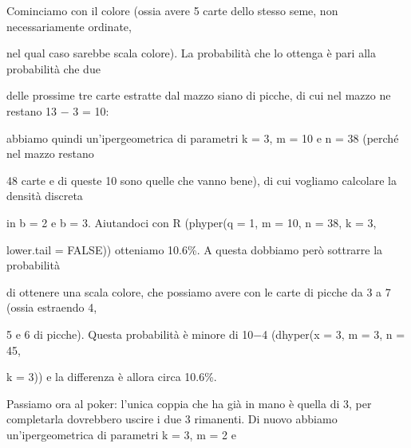 \documentclass[a4paper,portrait,12pt]{article}
\begin{document}
\begin{flushleft}
Cominciamo con il colore (ossia avere 5 carte dello stesso seme, non necessariamente ordinate,
\end{flushleft}


\begin{flushleft}
nel qual caso sarebbe scala colore). La probabilit\`{a} che lo ottenga \`{e} pari alla probabilit\`{a} che due
\end{flushleft}


\begin{flushleft}
delle prossime tre carte estratte dal mazzo siano di picche, di cui nel mazzo ne restano 13 $-$ 3 = 10:
\end{flushleft}


\begin{flushleft}
abbiamo quindi un'ipergeometrica di parametri k = 3, m = 10 e n = 38 (perch\'{e} nel mazzo restano
\end{flushleft}


\begin{flushleft}
48 carte e di queste 10 sono quelle che vanno bene), di cui vogliamo calcolare la densit\`{a} discreta
\end{flushleft}


\begin{flushleft}
in b = 2 e b = 3. Aiutandoci con R (phyper(q = 1, m = 10, n = 38, k = 3,
\end{flushleft}


\begin{flushleft}
lower.tail = FALSE)) otteniamo 10.6\%. A questa dobbiamo per\`{o} sottrarre la probabilit\`{a}
\end{flushleft}


\begin{flushleft}
di ottenere una scala colore, che possiamo avere con le carte di picche da 3 a 7 (ossia estraendo 4,
\end{flushleft}


\begin{flushleft}
5 e 6 di picche). Questa probabilit\`{a} \`{e} minore di 10$-$4 (dhyper(x = 3, m = 3, n = 45,
\end{flushleft}


\begin{flushleft}
k = 3)) e la differenza \`{e} allora circa 10.6\%.
\end{flushleft}


\begin{flushleft}
Passiamo ora al poker: l'unica coppia che ha gi\`{a} in mano \`{e} quella di 3, per completarla dovrebbero uscire i due 3 rimanenti. Di nuovo abbiamo un'ipergeometrica di parametri k = 3, m = 2 e
\end{flushleft}
\end{document}
